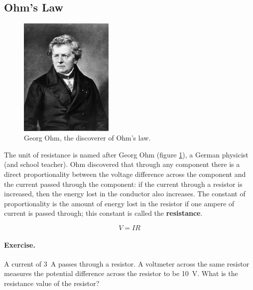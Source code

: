 \documentclass[a4paper]{amsbook}
\newcommand\capcite[1]{}
\begin{document}
\subsection{Ohm's Law}
\begin{figure}
  \centering
  \includegraphics[width=0.4\textwidth]{ohm}
  \caption{Georg Ohm, the discoverer of Ohm's law. \capcite{https://upload.wikimedia.org/wikipedia/commons/2/2a/Georg_Simon_Ohm3.jpg}\label{fig:ohm}}
\end{figure}
The unit of resistance is named after Georg Ohm (figure \ref{fig:ohm}), a German physicist (and school teacher). Ohm discovered that through
any component there is a direct proportionality between the voltage difference across the component and the current passed through the component:
if the current through a resistor is increased, then the energy lost in the conductor also increases. The constant of proportionality is the
amount of energy lost in the resistor if one ampere of current is passed through; this constant is called the \textbf{resistance}.

\begin{equation}
  V = IR
\end{equation}

\paragraph{Exercise.} A current of \SI{3}{\ampere} passes through a resistor. A voltmeter across the same resistor measures
the potential difference across the resistor to be \SI{10}{\volt}. What is the resistance value of the resistor?
\end{document}
